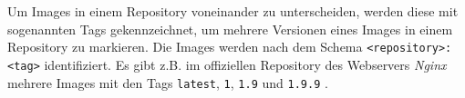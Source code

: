 \documentclass[../main.tex]{subfiles}
\begin{document}
			Um Images in einem Repository voneinander zu unterscheiden, werden diese mit sogenannten Tags gekennzeichnet, um mehrere Versionen eines Images in einem Repository zu markieren. Die Images werden nach dem Schema \texttt{<repository>:<tag>} identifiziert. Es gibt z.B. im offiziellen Repository des Webservers \emph{Nginx} mehrere Images mit den Tags \texttt{latest}, \texttt{1}, \texttt{1.9} und \texttt{1.9.9} \cite{dockerHubNginx}.




\end{document}

